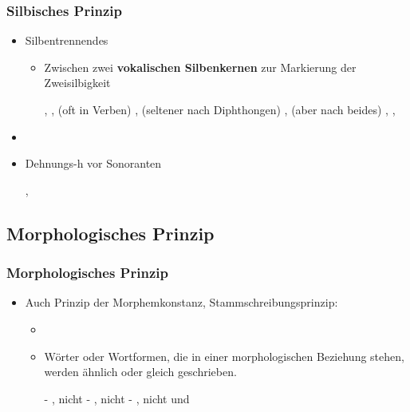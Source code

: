 \begin{frame}
\frametitle{Silbisches Prinzip}

\begin{itemize}
	\item Silbentrennendes 
	
	\begin{itemize}
		\item Zwischen zwei \textbf{vokalischen Silbenkernen} \ras zur Markierung der Zweisilbigkeit
		
		
		  \eal
                  \ex {}, , 
		  \ex (oft in Verben) , 
		  \ex (seltener nach Diphthongen) , 
		  \ex (aber nach  beides) , , 
                  \zl
		
	\end{itemize}
	\item[]
	\item Dehnungs-h vor Sonoranten

	  \ea
          , 
          \z

\end{itemize}


\end{frame}


\subsection{Morphologisches Prinzip}


\begin{frame}
\frametitle{Morphologisches Prinzip}

\begin{itemize}
	\item Auch Prinzip der Morphemkonstanz, Stammschreibungsprinzip:
	
	\begin{itemize}
		\item[]
		\item Wörter oder Wortformen, die in einer morphologischen Beziehung stehen, werden ähnlich oder gleich geschrieben.
		
		  \eal
                  \ex {} - , nicht 
		  \ex {} - , nicht 
		  \ex {} - , nicht  und 
                  \zl
			 
	\end{itemize}
\end{itemize}


\end{frame}


